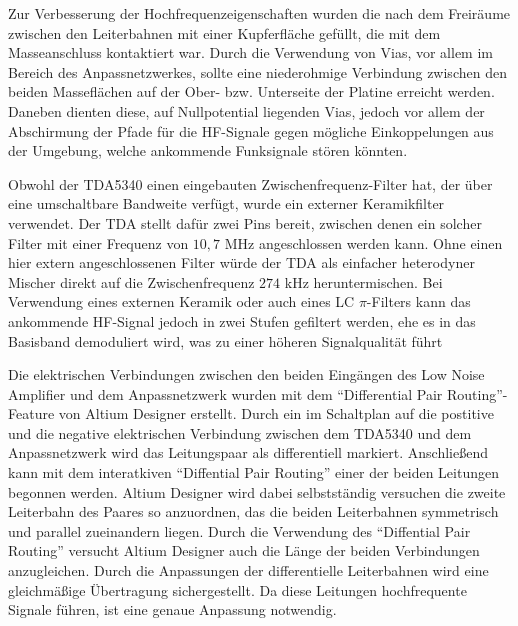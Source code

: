 Zur Verbesserung der Hochfrequenzeigenschaften wurden die nach dem Freiräume zwischen den Leiterbahnen mit einer Kupferfläche gefüllt, die mit dem Masseanschluss kontaktiert war. Durch die Verwendung von Vias, vor allem im Bereich des Anpassnetzwerkes, sollte eine niederohmige Verbindung zwischen den beiden Masseflächen auf der Ober- bzw. Unterseite der Platine erreicht werden. Daneben dienten diese, auf Nullpotential liegenden Vias, jedoch vor allem der Abschirmung der Pfade für die HF-Signale gegen mögliche Einkoppelungen aus der Umgebung, welche ankommende Funksignale stören könnten.

Obwohl der TDA5340 einen eingebauten Zwischenfrequenz-Filter hat, der über eine umschaltbare Bandweite verfügt, wurde ein externer Keramikfilter verwendet. Der TDA stellt dafür zwei Pins bereit, zwischen denen ein solcher Filter mit einer Frequenz von  $10,7$ MHz angeschlossen werden kann. Ohne einen hier extern angeschlossenen Filter würde der TDA als einfacher heterodyner Mischer direkt auf die Zwischenfrequenz $274$ kHz heruntermischen. Bei Verwendung eines externen Keramik oder auch eines LC $\pi$-Filters kann das ankommende HF-Signal jedoch in zwei Stufen gefiltert werden, ehe es in das Basisband demoduliert wird, was zu einer höheren Signalqualität führt%

Die elektrischen Verbindungen zwischen den beiden Eingängen des Low Noise Amplifier und dem Anpassnetzwerk wurden mit dem \enquote{Differential Pair Routing}-Feature von Altium Designer erstellt. Durch ein im Schaltplan auf die postitive und die negative elektrischen Verbindung zwischen dem TDA5340 und dem Anpassnetzwerk wird das Leitungspaar als differentiell markiert. Anschließend kann mit dem interatkiven \enquote{Diffential Pair Routing} einer der beiden Leitungen begonnen werden. Altium Designer wird dabei selbstständig versuchen die zweite Leiterbahn des Paares so anzuordnen, das die beiden Leiterbahnen symmetrisch und parallel zueinandern liegen. %
Durch die Verwendung des \enquote{Diffential Pair Routing} versucht Altium Designer auch die Länge der beiden Verbindungen anzugleichen. Durch die Anpassungen der differentielle Leiterbahnen wird eine gleichmäßige Übertragung sichergestellt. Da diese Leitungen hochfrequente Signale führen, ist eine genaue Anpassung notwendig.




